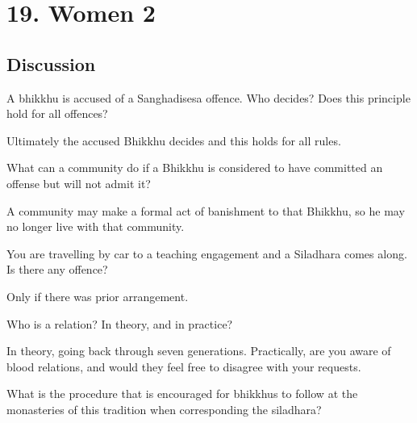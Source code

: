 \chapter{19. Women 2}
\renewcommand*{\theChapterTitle}{19. Women 2}

\section*{Discussion}


A bhikkhu is accused of a Sanghadisesa offence. Who decides? Does this principle hold for all offences?

\begin{solution}
  Ultimately the accused Bhikkhu decides and this holds for all rules. 
\end{solution}

\bigskip

What can a community do if a Bhikkhu is considered to have committed an offense but will not admit it?

\begin{solution}
  A community may make a formal act of banishment to that Bhikkhu, so he may no
  longer live with that community.
\end{solution}

\bigskip


You are travelling by car to a teaching engagement and a Siladhara comes along. Is there any offence?

\begin{solution}
  Only if there was prior arrangement.
\end{solution}

\bigskip

Who is a relation? In theory, and in practice?

\begin{solution}
  In theory, going back through seven generations. Practically, are you aware of
  blood relations, and would they feel free to disagree with your requests.
\end{solution}

\bigskip

What is the procedure that is encouraged for bhikkhus to follow at the monasteries of this tradition 
when corresponding the siladhara?

